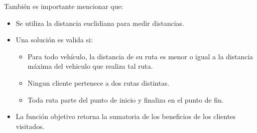 \bigskip

\begin{minipage}{\textwidth}
También es importante mencionar que:

\begin{itemize}
	\item Se utiliza la distancia euclidiana para medir distancias.
	\item Una solución es valida si:
	\begin{itemize}
		\item Para todo vehículo, la distancia de su ruta es menor o igual a la distancia máxima del vehiculo que realiza tal ruta.
		\item Ningun cliente pertenece a dos rutas distintas.
		\item Toda ruta parte del punto de inicio y finaliza en el punto de fin.
	\end{itemize}
	\item La función objetivo retorna la sumatoria de los beneficios de los clientes visitados.
\end{itemize}
\end{minipage}





























